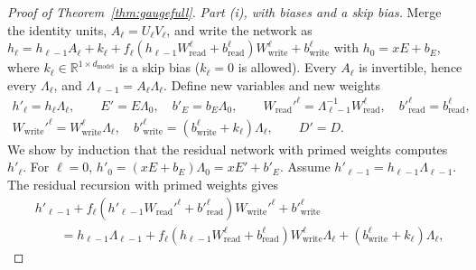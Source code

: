 \documentclass[10pt]{article}
\theoremstyle{definition}
\theoremstyle{remark}
\newcommand{\R}{\mathbb{R}}
\newcommand{\Wread}{W_{\mathrm{read}}}
\newcommand{\Wwrite}{W_{\mathrm{write}}}
\newcommand{\dm}{d_{\mathrm{model}}}
\begin{document}
\begin{proof}[Proof of Theorem~\ref{thm:gaugefull}]
\emph{Part (i), with biases and a skip bias.} Merge the identity units, $A_\ell = U_\ell V_\ell$, and write the network as $h_\ell = h_{\ell-1}A_\ell + k_\ell + f_\ell(h_{\ell-1}\Wread^{\ell} + b^{\ell}_{\mathrm{read}})\Wwrite^{\ell} + b^{\ell}_{\mathrm{write}}$ with $h_0 = xE + b_E$, where $k_\ell \in \R^{1\times\dm}$ is a skip bias ($k_\ell = 0$ is allowed). Every $A_\ell$ is invertible, hence every $\Lambda_\ell$, and $\Lambda_{\ell-1} = A_\ell\Lambda_\ell$. Define new variables and new weights
\begin{gather*}
h'_\ell = h_\ell\Lambda_\ell,\qquad E' = E\Lambda_0,\quad b'_E = b_E\Lambda_0,\qquad
\Wread'^{\ell} = \Lambda_{\ell-1}^{-1}\Wread^{\ell},\quad b'^{\ell}_{\mathrm{read}} = b^{\ell}_{\mathrm{read}},\\
\Wwrite'^{\ell} = \Wwrite^{\ell}\Lambda_\ell,\quad b'^{\ell}_{\mathrm{write}} = (b^{\ell}_{\mathrm{write}} + k_\ell)\Lambda_\ell,\qquad
D' = D .
\end{gather*}
We show by induction that the residual network with primed weights computes $h'_\ell$. For $\ell = 0$, $h'_0 = (xE + b_E)\Lambda_0 = xE' + b'_E$. Assume $h'_{\ell-1} = h_{\ell-1}\Lambda_{\ell-1}$. The residual recursion with primed weights gives
\begin{align*}
&h'_{\ell-1} + f_\ell(h'_{\ell-1}\Wread'^{\ell} + b'^{\ell}_{\mathrm{read}})\Wwrite'^{\ell} + b'^{\ell}_{\mathrm{write}}\\
&\qquad= h_{\ell-1}\Lambda_{\ell-1} + f_\ell(h_{\ell-1}\Wread^{\ell} + b^{\ell}_{\mathrm{read}})\Wwrite^{\ell}\Lambda_\ell + (b^{\ell}_{\mathrm{write}} + k_\ell)\Lambda_\ell,
\end{align*}

\end{proof}
\end{document}
